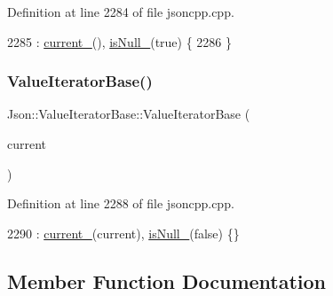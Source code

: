 Definition at line 2284 of file jsoncpp.\+cpp.


\begin{DoxyCode}
2285     : \hyperlink{class_json_1_1_value_iterator_base_ab3138ce8af8301cca3b041ea55cb922a}{current\_}(), \hyperlink{class_json_1_1_value_iterator_base_a3e08b114a1aed9bde518c527f94a8c59}{isNull\_}(\textcolor{keyword}{true}) \{
2286 \}
\end{DoxyCode}
\mbox{\label{class_json_1_1_value_iterator_base_a640e990e5f03a96fd650122a2906f59d}} 
\subsubsection{\texorpdfstring{Value\+Iterator\+Base()}{ValueIteratorBase()}\hspace{0.1cm}{\footnotesize\ttfamily [2/2]}}
{\footnotesize\ttfamily Json\+::\+Value\+Iterator\+Base\+::\+Value\+Iterator\+Base (\begin{DoxyParamCaption}\item[{const Value\+::\+Object\+Values\+::iterator \&}]{current }\end{DoxyParamCaption})\hspace{0.3cm}{\ttfamily [explicit]}}



Definition at line 2288 of file jsoncpp.\+cpp.


\begin{DoxyCode}
2290     : \hyperlink{class_json_1_1_value_iterator_base_ab3138ce8af8301cca3b041ea55cb922a}{current\_}(current), \hyperlink{class_json_1_1_value_iterator_base_a3e08b114a1aed9bde518c527f94a8c59}{isNull\_}(\textcolor{keyword}{false}) \{\}
\end{DoxyCode}


\subsection{Member Function Documentation}
\mbox{\label{class_json_1_1_value_iterator_base_af11473c9e20d07782e42b52a2f9e4540}} 
